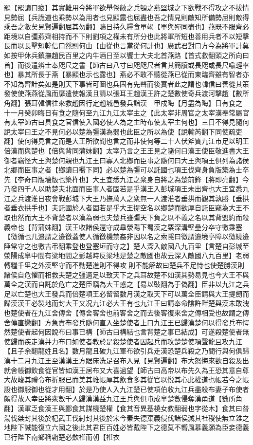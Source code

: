 罷【罷讀曰疲】其實難用今將軍欲舉倦敝之兵頓之燕堅城之下欲戰不得攻之不拔情見勢屈【兵詭道也乘勢以為用者也見顯露也屈盡也吾之情見則敵知所備勢屈則敵得乘吾之敝矣見賢遍翻屈其勿翻】曠日持久糧食單竭【單與殫同盡也】燕既不服齊必距境以自彊燕齊相持而不下則劉項之權未有所分也此將軍所短也善用兵者不以短擊長而以長擊短韓信曰然則何由【由從也言當從何計也】廣武君對曰方今為將軍計莫如按甲休兵鎮撫趙民百里之内牛酒日至以饗士大夫北首燕路【首式救翻頭之所向曰首】而後遣辨士奉咫尺之書【師古曰八寸曰咫咫尺者言其簡牘或長咫或長尺喩輕率也】暴其所長于燕【暴顯也示也露也】燕必不敢不聽從燕已從而東臨齊雖有智者亦不知為齊計矣如是則天下事皆可圖也兵固有先聲而後實者此之謂也韓信曰善從其策發使使燕燕從風而靡遣使報漢且請以張耳王趙漢王許之楚數使奇兵渡河擊趙【數所角翻】張耳韓信往來救趙因行定趙城邑發兵詣漢　甲戍晦【月盡為晦】日有食之　十一月癸卯晦日有食之隨何至九江九江太宰主之【此太宰非周官之太宰漢奉常屬官有太宰師古曰具食之官信使入國必使人為之主時布使太宰主何也】三日不得見隨何說太宰曰王之不見何必以楚為彊漢為弱也此臣之所以為使【說輸芮翻下同使疏吏翻】使何得見言之而是大王所欲聞也言之而非使何等二十人伏斧質九江市足以明王倍漢而與楚也【倍與背同蒲妹翻】太宰乃言之王王見之隨何曰漢王使臣敬進書大王御者竊怪大王與楚何親也九江王曰寡人北鄉而臣事之隨何曰大王與項王俱列為諸侯北鄉而臣事之者【鄉讀曰嚮下同】必以楚為彊可以託國也項王伐齊身負版築為士卒先【李奇曰版墻版也築杵也】大王宜悉九江之衆身自將之為楚前鋒【將即亮翻】今乃發四千人以助楚夫北面而臣事人者固若是乎漢王入彭城項王未出齊也大王宜悉九江之兵渡淮日夜會戰彭城下大王乃撫萬人之衆無一人渡淮者垂拱而觀其孰勝【垂拱者垂衣拱手也】夫託國於人者固若是乎大王提空名以鄉楚而欲厚自託臣竊為大王不取也然而大王不背楚者以漢為弱也夫楚兵雖彊天下負之以不義之名以其背盟約而殺義帝也【背蒲妹翻】漢王收諸侯還守成臯滎陽下蜀漢之粟深溝壁壘分卒守徼乘塞【徼循也几邉謂之邉徼蓋使人循徼機禁姦非因以名之索隱曰徼謂邉境亭障以徼繞邉陲常守之也徼吉弔翻乘登也登塞垣而守之】楚人深入敵國八九百里【言楚自彭城至滎陽成臯中間有梁地間之彭越時反梁地是楚之敵國也故云深入敵國八九百里】老弱轉糧千里之外漢堅守而不動楚進則不得攻則不能解故曰楚兵不足恃也使楚勝漢則諸侯自危懼而相救夫楚之彊適足以致天下之兵耳故楚不如漢其勢易見也今大王不與萬全之漢而自託於危亡之楚臣竊為大王惑之【易以䜴翻為于偽翻】臣非以九江之兵足以亡楚也大王發兵而倍楚項王必留留數月漢之取天下可以萬全臣請與大王提劒而歸漢漢王必裂地而封大王又况九江必大王有也九江王曰請奉命隂許畔楚與漢未敢洩也楚使者在九江舍傳舍【傳舍客舍也前客舍之而去後客復來舍之傳相受也故謂之傳舍傳直戀翻】方急責布發兵隨何直入坐楚使者上曰九江王已歸漢楚何以得發兵布愕然楚使者起何因說布曰事已構【師古曰構結也言背楚之事已結成】可遂殺楚使者無使歸而疾走漢并力布曰如使者教於是殺楚使者因起兵而攻楚楚使項聲龍且攻九江【且子余翻龍姓且名】數月龍且破九江軍布欲引兵走漢恐楚兵殺之乃間行與何俱歸漢十二月九江王至漢漢王方踞床洗足召布入見【見賢遍翻】布大怒悔來欲自殺及出就舍帳御飲食從官皆如漢王居布又大喜過望【師古曰高帝以布先久為王恐其意自尊大故峻其禮令布折服已而美其帷帳厚其飲食多其從官以悦其心此權道也帳若今之帳設也御服御也從才用翻】於是乃使人入九江楚已使項伯收九江兵盡殺布妻子布使者頗得故人幸臣將衆數千人歸漢漢益九江王兵與俱屯成臯楚數侵奪漢甬道【數所角翻】漢軍乏食漢王與酈食其謀橈楚權【食其音異基橈女教翻弱也字從木】食其曰㫺湯伐桀封其後於杞武王伐紂封其後於宋今秦失德棄義侵伐諸侯滅其社稷使無立錐之地陛下誠能復立六國之後此其君臣百姓必皆戴陛下之德莫不嚮風慕義願為臣妾德義已行陛下南鄉稱覇楚必歛袵而朝【袵衣